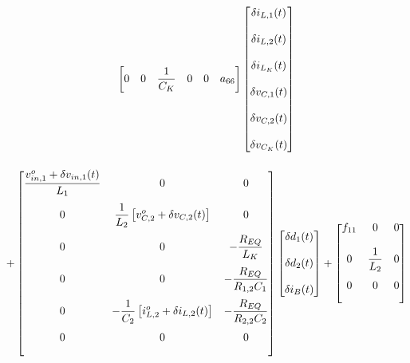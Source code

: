 \begin{gather}
\begin{bmatrix}
    0                         & 0                         & \displaystyle \frac{1}{C_K}                         & 0                                    & 0                                    & a_{66}
  \end{bmatrix}
  \begin{bmatrix}
    \delta i_{L,1}(t) \\[12pt] \delta i_{L,2}(t) \\[12pt] \delta i_{L_K}(t) \\[12pt]
    \delta v_{C,1}(t) \\[12pt] \delta v_{C,2}(t) \\[12pt] \delta v_{C_K}(t)
  \end{bmatrix} \notag \\[12pt] +
  \begin{bmatrix}
    \displaystyle \frac{v_{in,1}^o + \delta v_{in,1}(t)}{L_1} & 0                 & 0                                                        \\[12pt]
    0                      & \displaystyle \frac{1}{L_2} \left[ v_{C,2}^o + \delta v_{C,2}(t) \right]     & 0                              
                                    \\[12pt]
    0                      & 0                 & - \displaystyle \frac{R_{EQ}}{L_K}                                     \\[12pt]
    0                      & 0                 & - \displaystyle \frac{R_{EQ}}{R_{1,2}C_1}                    \\[12pt]
    0                      & - \displaystyle \frac{1}{C_2} \left[ i_{L,2}^o + \delta i_{L,2}(t) \right]                 & - \displaystyle \frac{R_{EQ}}{R_{2,2}C_2}                                      \\[12pt]
    0                      & 0                 & 0 
                                    \\[12pt]
  \end{bmatrix}
  \begin{bmatrix}
    \delta d_1(t) \\[12pt] \delta d_2(t) \\[12pt] \delta i_{B}(t)
  \end{bmatrix} +
  \begin{bmatrix}
      f_{11} & 0                   & 0
                            \\[12pt]
      0 & \displaystyle \frac{1}{L_2}   & 0 
                            \\[12pt]
      0 & 0                   & 0
                            \\[12pt]

\end{bmatrix}
\end{gather}
